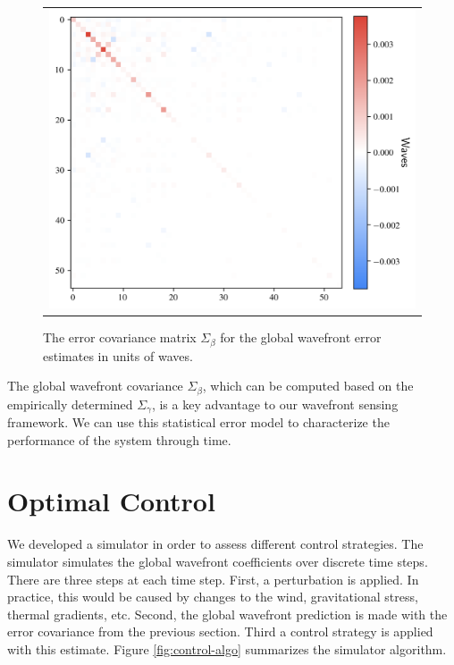 \begin{figure}[!htbp]
\begin{center}
\begin{tabular}{c}
\includegraphics[width=\textwidth]{figs/control/beta_cov_written_thesis.png}
\end{tabular}
\end{center}
\caption[Error Covariance Of Global Wavefront Estimates]{The error covariance matrix $\Sigma_{\beta}$ for the global wavefront error estimates in units of waves.\label{fig:small-cov}}
\end{figure}

The global wavefront covariance $\Sigma_{\beta}$, which can be computed based on the empirically determined $\Sigma_{\gamma}$, is a key advantage to our wavefront sensing framework. We can use this statistical error model to characterize the performance of the system through time.

\section{Optimal Control}
\label{sec:optcont}

We developed a simulator in order to assess different control strategies. The simulator simulates the global wavefront coefficients over discrete time steps. There are three steps at each time step. First, a perturbation is applied. In practice, this would be caused by changes to the wind, gravitational stress, thermal gradients, etc. Second, the global wavefront prediction is made with the error covariance from the previous section. Third a control strategy is applied with this estimate. Figure \ref{fig:control-algo} summarizes the simulator algorithm. 

